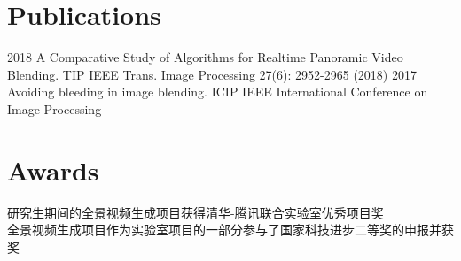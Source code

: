 \documentclass[]{cv-style} %
\begin{document}
\section{Publications}
\begin{entrylist}
\entry
{2018}
{A Comparative Study of Algorithms for Realtime Panoramic Video Blending.}
{TIP}
{ IEEE Trans. Image Processing 27(6): 2952-2965 (2018)}
\entry
{2017}
{Avoiding bleeding in image blending.}
{ICIP}
{IEEE International Conference on Image Processing}
\end{entrylist}
\vspace{-10pt}
\section{Awards}
\begin{entrylist}
  \vspace{5pt}
   \hspace{0.2cm}研究生期间的全景视频生成项目获得清华-腾讯联合实验室优秀项目奖\\
   \hspace{0.2cm}全景视频生成项目作为实验室项目的一部分参与了国家科技进步二等奖的申报并获奖
\end{entrylist}



\end{document}
